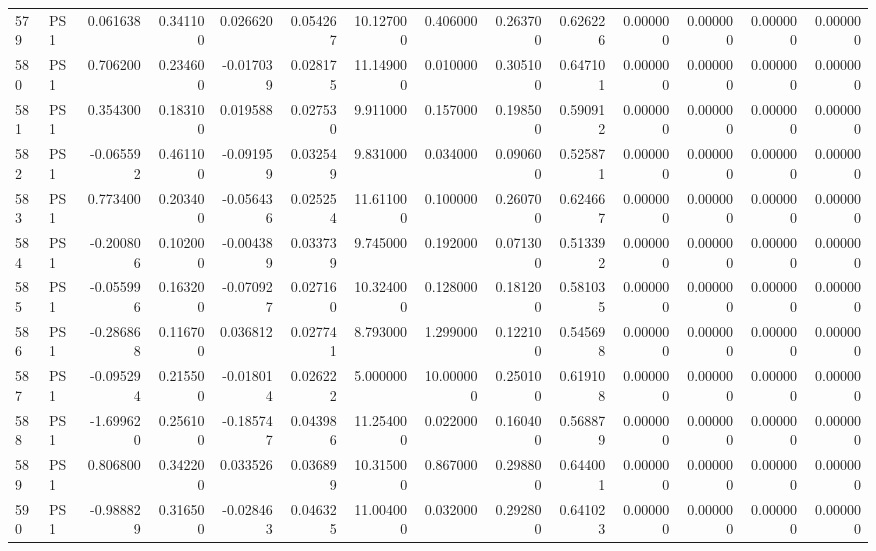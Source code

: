 \begin{tabular}{llrrrrrrrrrrrr}
579 &    PS1 &  0.061638 &      0.341100 &  0.026620 &    0.054267 &  10.127000 &      0.406000 &   0.263700 &  0.626226 &  0.000000 &   0.000000 &     0.000000 &     0.000000 \\
580 &    PS1 &  0.706200 &      0.234600 & -0.017039 &    0.028175 &  11.149000 &      0.010000 &   0.305100 &  0.647101 &  0.000000 &   0.000000 &     0.000000 &     0.000000 \\
581 &    PS1 &  0.354300 &      0.183100 &  0.019588 &    0.027530 &   9.911000 &      0.157000 &   0.198500 &  0.590912 &  0.000000 &   0.000000 &     0.000000 &     0.000000 \\
582 &    PS1 & -0.065592 &      0.461100 & -0.091959 &    0.032549 &   9.831000 &      0.034000 &   0.090600 &  0.525871 &  0.000000 &   0.000000 &     0.000000 &     0.000000 \\
583 &    PS1 &  0.773400 &      0.203400 & -0.056436 &    0.025254 &  11.611000 &      0.100000 &   0.260700 &  0.624667 &  0.000000 &   0.000000 &     0.000000 &     0.000000 \\
584 &    PS1 & -0.200806 &      0.102000 & -0.004389 &    0.033739 &   9.745000 &      0.192000 &   0.071300 &  0.513392 &  0.000000 &   0.000000 &     0.000000 &     0.000000 \\
585 &    PS1 & -0.055996 &      0.163200 & -0.070927 &    0.027160 &  10.324000 &      0.128000 &   0.181200 &  0.581035 &  0.000000 &   0.000000 &     0.000000 &     0.000000 \\
586 &    PS1 & -0.286868 &      0.116700 &  0.036812 &    0.027741 &   8.793000 &      1.299000 &   0.122100 &  0.545698 &  0.000000 &   0.000000 &     0.000000 &     0.000000 \\
587 &    PS1 & -0.095294 &      0.215500 & -0.018014 &    0.026222 &   5.000000 &     10.000000 &   0.250100 &  0.619108 &  0.000000 &   0.000000 &     0.000000 &     0.000000 \\
588 &    PS1 & -1.699620 &      0.256100 & -0.185747 &    0.043986 &  11.254000 &      0.022000 &   0.160400 &  0.568879 &  0.000000 &   0.000000 &     0.000000 &     0.000000 \\
589 &    PS1 &  0.806800 &      0.342200 &  0.033526 &    0.036899 &  10.315000 &      0.867000 &   0.298800 &  0.644001 &  0.000000 &   0.000000 &     0.000000 &     0.000000 \\
590 &    PS1 & -0.988829 &      0.316500 & -0.028463 &    0.046325 &  11.004000 &      0.032000 &   0.292800 &  0.641023 &  0.000000 &   0.000000 &     0.000000 &     0.000000 \\

\end{tabular}
